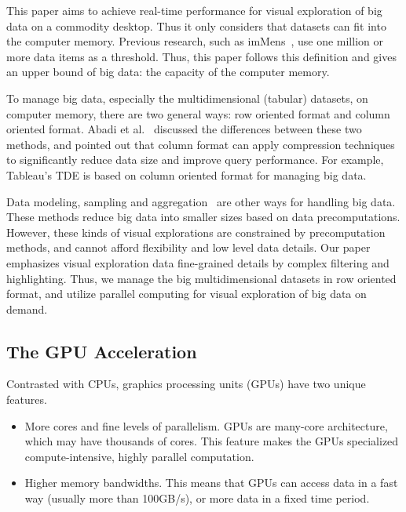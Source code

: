This paper aims to achieve real-time performance for visual exploration of big data on a commodity desktop. Thus it only considers that datasets can fit into the computer memory. Previous research, such as  imMens~\cite{2013-immens}, use one million or more data items as a threshold. Thus, this paper follows this definition and gives an upper bound of  big data: the capacity of the computer memory.

To manage big data, especially the multidimensional (tabular) datasets, on computer memory, there are two general ways: row oriented format and column oriented format. Abadi et al.~\cite{Abadi:2008} discussed the differences between these two methods, and pointed out that column format can apply compression techniques to significantly reduce data size and improve query performance. For example, Tableau's TDE is based on column oriented format for managing big data.

Data modeling, sampling and aggregation~\cite{2013-immens} are other ways for handling big data. These methods reduce big data into smaller sizes based on data precomputations. However, these kinds of  visual explorations are constrained by precomputation methods, and cannot afford flexibility and low level data details. Our paper emphasizes  visual exploration data fine-grained details by complex filtering and highlighting. Thus, we manage the big multidimensional datasets in row oriented format, and utilize parallel computing for visual exploration of big data on demand. %

\subsection{The GPU Acceleration}

Contrasted with CPUs, graphics processing units (GPUs) have two unique features.

\begin{itemize}
	\item More cores and fine levels of parallelism. GPUs are many-core architecture, which may have thousands of cores.  This feature makes the GPUs  specialized compute-intensive, highly parallel computation. 
	\item Higher memory bandwidths. This means that  GPUs can access data in a fast way (usually more than 100GB/s), or more data in a fixed time period.
\end{itemize}

